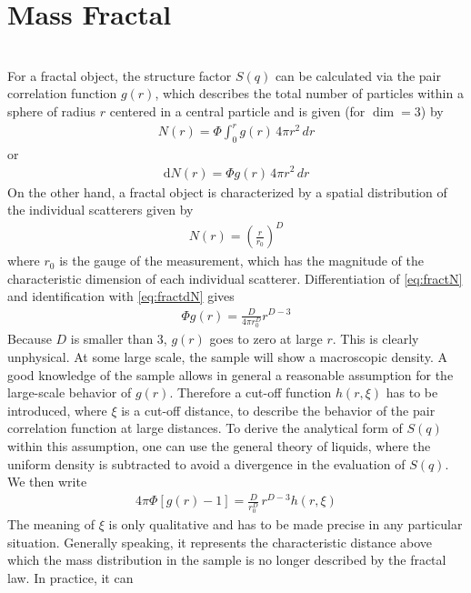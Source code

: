 \section{Mass Fractal}~\\
\label{sect:SQ4clusteraggregates}
For a fractal object, the structure factor $S(q)$ can be calculated
\cite{Sorensen1999,Sorensen1992} via
the pair correlation function $g(r)$, which describes the total number of
particles within a sphere of radius $r$ centered in a central
particle and is given (for $\dim = 3$) by
\begin{align}
N(r) = \Phi \int_0^r g(r) \, 4\pi r^2 \, dr
\end{align}
or
\begin{align}
\textrm{d}N(r) = \Phi  g(r) \, 4\pi r^2 \, dr \label{eq:fractdN}
\end{align}
On the other hand, a fractal object is characterized by a spatial
distribution of the individual scatterers given by
\begin{align}
N(r) = \left( \frac{r}{r_0} \right)^D \label{eq:fractN}
\end{align}
where $r_0$ is the gauge of the measurement, which has
the magnitude of the characteristic dimension of each
individual scatterer.
Differentiation of \ref{eq:fractN} and identification with \ref{eq:fractdN}
gives
\begin{align}
\Phi g(r) = \frac{D}{4\pi r_0^D} r^{D-3}
\end{align}
Because $D$ is smaller than 3, $g(r)$ goes to zero at
large $r$. This is clearly unphysical.
At some large scale, the sample will show a
macroscopic density. A good knowledge of the sample
allows in general a reasonable assumption for the
large-scale behavior of $g(r)$. Therefore a cut-off function
$h(r,\xi)$ has to be introduced, where $\xi$ is a cut-off distance, to
describe the behavior of the pair correlation function
at large distances. To derive the analytical form of
$S(q)$ within this assumption, one can use the general
theory of liquids, where the uniform density is subtracted
to avoid a divergence in the evaluation of $S(q)$.
We then write
\begin{align}
4\pi\Phi[g(r)-1] = \frac{D}{r_0^D} \, r^{D-3} h(r,\xi)
\label{eq:fract_g(r)-1}
\end{align}
The meaning of $\xi$ is only qualitative and has to be
made precise in any particular situation. Generally
speaking, it represents the characteristic distance
above which the mass distribution in the sample is no
longer described by the fractal law. In practice, it can
